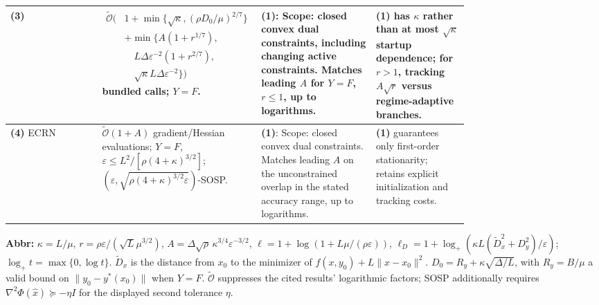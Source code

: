 \begin{table}[tp]
\begin{threeparttable}
\begin{tabularx}{\linewidth}{@{}>{\raggedright\arraybackslash}p{0.20\linewidth}>{\raggedright\arraybackslash}p{0.32\linewidth}>{\raggedright\arraybackslash}p{0.25\linewidth}>{\raggedright\arraybackslash}X@{}}
\midrule
\textbf{(3)} \citep[Theorem 4.1, v2]{cmsZhang2026v2} &
$\begin{aligned}\widetilde{\mathcal{O}}\bigl(&1+\min\{\sqrt\kappa,(\rho D_0/\mu)^{2/7}\}\\&+\min\{A(1+r^{1/7}),\\&\quad L\Delta\varepsilon^{-2}(1+r^{2/7}),\\&\quad\sqrt\kappa L\Delta\varepsilon^{-2}\}\bigr)\end{aligned}$ bundled calls; $Y=F$. &
\textbf{(1)}: Scope: closed convex dual constraints, including changing active constraints. Matches leading $A$ for $Y=F$, $r\le1$, up to logarithms. &
\textbf{(1)} has $\kappa$ rather than at most $\sqrt\kappa$ startup dependence; for $r>1$, tracking $A\sqrt r$ versus regime-adaptive branches. \\
\midrule
\textbf{(4)} ECRN \citep[Theorem 11, v1]{cmsZhou2026v1} &
$\widetilde{\mathcal{O}}(1+A)$ gradient/Hessian evaluations; $Y=F$, $\varepsilon\le L^2/[\rho(4+\kappa)^{3/2}]$; $(\varepsilon,\sqrt{\rho(4+\kappa)^{3/2}\varepsilon})$-SOSP. &
\textbf{(1)}: Scope: closed convex dual constraints. Matches leading $A$ on the unconstrained overlap in the stated accuracy range, up to logarithms. &
\textbf{(1)} guarantees only first-order stationarity; retains explicit initialization and tracking costs. \\
\bottomrule
\end{tabularx}
\begin{tablenotes}[flushleft]\footnotesize
\item[] \textbf{Abbr:} $\kappa=L/\mu$, $r=\rho\varepsilon/(\sqrt L\mu^{3/2})$, $A=\Delta\sqrt\rho\,\kappa^{3/4}\varepsilon^{-3/2}$, $\ell=1+\log(1+L\mu/(\rho\varepsilon))$, $\ell_D=1+\log_+(\kappa L(\widetilde D_x^2+D_y^2)/\varepsilon)$; $\log_+t=\max\{0,\log t\}$. $\widetilde D_x$ is the distance from $x_0$ to the minimizer of $f(x,y_0)+L\|x-x_0\|^2$. $D_0=R_y+\kappa\sqrt{\Delta/L}$, with $R_y=B/\mu$ a valid bound on $\|y_0-y^*(x_0)\|$ when $Y=F$. $\widetilde{\mathcal{O}}$ suppresses the cited results' logarithmic factors; SOSP additionally requires $\nabla^2\Phi(\hat x)\succeq-\eta I$ for the displayed second tolerance $\eta$.
\end{tablenotes}
\end{threeparttable}
\end{table}
\clearpage
